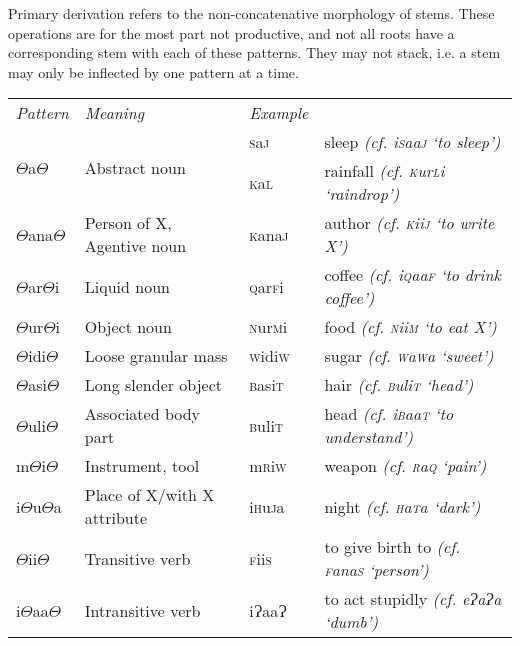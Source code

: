 \documentclass[a4paper,10pt,twoside,openright]{memoir}
\newcommand{\rootpart}{$\Theta$}
\newcommand{\bigglot}{Ɂ}
\newcommand{\famword}[5]{#1\textsc{#2}#3\textsc{#4}#5}
\begin{document}
Primary derivation refers to the non-concatenative morphology of stems. These operations are for the most part not productive, and not all roots have a corresponding stem with each of these patterns. They may not stack, i.e. a stem may only be inflected by one pattern at a time.

\begin{table}[ht]
    \centering
    \begin{tabular}{llll}
    \textit{Pattern} & \textit{Meaning} & \textit{Example} & \\
    \multirow{2}{*}{{\rootpart}a{\rootpart}} & \multirow{2}{*}{Abstract noun}& \famword{}{s}{a}{j}{} & sleep \emph{(cf. \famword{i}{s}{aa}{j}{} `to sleep')}\\
    & & \famword{}{k}{a}{l}{} & rainfall \emph{(cf. \famword{}{k}{ur}{l}{i} `raindrop')}\\
    {\rootpart}ana{\rootpart} & Person of X, Agentive noun & \famword{}{k}{ana}{j}{} & author \emph{(cf. \textsc{k}ii\textsc{j} `to write X')}\\
    {\rootpart}ar{\rootpart}i & Liquid noun & \famword{}{q}{ar}{f}{i} & coffee \emph{(cf. i\textsc{q}aa\textsc{f} `to drink coffee')} \\
    {\rootpart}ur{\rootpart}i & Object noun & \famword{}{n}{ur}{m}{i} & food \emph{(cf. \textsc{n}ii\textsc{m} `to eat X')}\\
    {\rootpart}idi{\rootpart} & Loose granular mass & \famword{}{w}{idi}{w}{} & sugar \emph{(cf. \textsc{w}a\textsc{w}a `sweet')} \\
    {\rootpart}asi{\rootpart} & Long slender object & \famword{}{b}{asi}{t}{} & hair \emph{(cf. \textsc{b}uli\textsc{t} `head')} \\
    {\rootpart}uli{\rootpart} & Associated body part & \famword{}{b}{uli}{t}{} & head \emph{(cf. i\textsc{b}aa\textsc{t} `to understand')}\\
    m{\rootpart}i{\rootpart} & Instrument, tool & \famword{m}{r}{i}{w}{} & weapon \emph{(cf. \textsc{r}a\textsc{q} `pain')} \\
    i{\rootpart}u{\rootpart}a & Place of X/with X attribute & \famword{i}{h}{u}{j}{a} & night \emph{(cf. \textsc{h}a\textsc{t}a `dark')} \\
    {\rootpart}ii{\rootpart} & Transitive verb & \famword{}{f}{ii}{s}{} & to give birth to \emph{(cf. \textsc{f}ana\textsc{s} `person')} \\
    i{\rootpart}aa{\rootpart} & Intransitive verb & \famword{i}{\bigglot}{aa}{\bigglot}{} & to act stupidly \emph{(cf. e\bigglot a\bigglot a `dumb')} \\

\end{tabular}
\end{table}
\end{document}
